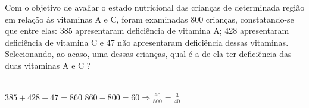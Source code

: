 \begin{ex}
Com o objetivo de avaliar o estado nutricional das crianças de determinada região em relação às vitaminas A e C, foram examinadas 800 crianças, constatando-se que entre elas: 385 apresentaram deficiência de vitamina A; 428 apresentaram deficiência de vitamina C e 47 não apresentaram deficiência dessas vitaminas. Selecionando, ao acaso, uma dessas crianças, qual é a de ela ter deficiência das duas vitaminas A e C ?
  \begin{sol}
   \phantom{A}\\
   $385+428+47=860$ \hspace{0,5cm} $860-800=60 \Longrightarrow \frac{60}{800}=\frac{3}{40}$
  \end{sol}
\end{ex}